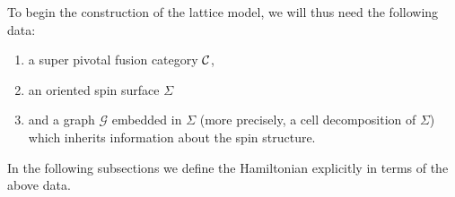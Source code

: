 \documentclass[12pt,a4paper]{article}
\newcommand{\mcg}{\mathcal{G}}
\newcommand{\mcc}{\mathcal{C}}
\newcommand{\kw}[1]{{\color{kwcolor}\footnotesize{(KW) #1}}}
\newcommand{\dave}[1]{{\color{ao(english)}\footnotesize{(DA) #1}}}
\newcommand{\ethan}[1]{{\color{amethyst}\footnotesize{(EL) #1}}}
\begin{document}
To begin the construction of the lattice model, we will thus need the following data:
\begin{enumerate}
\item a super pivotal fusion category ${\cal C}$,
\item an oriented spin surface $\Sigma$ %
\item and a graph $\mcg$ embedded in $\Sigma$ (more precisely, a cell decomposition of $\Sigma$) which inherits information about the spin structure.
\end{enumerate}
In the following subsections we define the Hamiltonian explicitly in terms of the above data.
\end{document}
